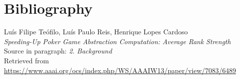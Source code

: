 \documentclass[11pt]{article}
\begin{document}
\newpage
\section{Bibliography}

\renewcommand\refname{Bibliography}
\begin{thebibliography}{9}

\begin{flushleft}
	Luís Filipe Teófilo, Luís Paulo Reis, Henrique Lopes Cardoso \\
	\textit{Speeding-Up Poker Game Abstraction Computation: Average Rank Strength} \\
	Source in paragraph: \textit{2. Background} \\
	Retrieved from \url{https://www.aaai.org/ocs/index.php/WS/AAAIW13/paper/view/7083/6489}
\end{flushleft}


\end{thebibliography}
\end{document}
